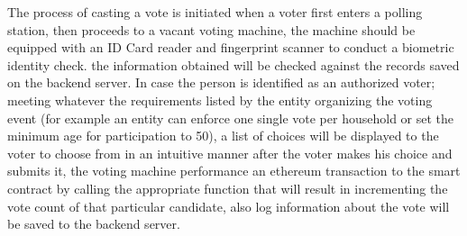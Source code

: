 The process of casting a vote is initiated when a voter first enters a polling station, then proceeds to a vacant voting machine, the machine should be equipped with an ID Card reader and fingerprint scanner to conduct a biometric identity check. the information obtained will be checked against the records saved on the backend server. In case the person is identified as an authorized voter; meeting whatever the requirements listed by the entity organizing the voting event (for example an entity can enforce one single vote per household or set the minimum age for participation to 50), a list of choices will be displayed to the voter to choose from in an intuitive manner after the voter makes his choice and submits it, the voting machine performance an ethereum transaction to the smart contract by calling the appropriate function that will result in incrementing the vote count of that particular candidate, also log information about the vote will be saved to the backend server.
